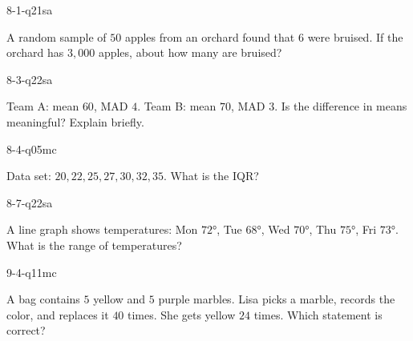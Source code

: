 \begin{practiceQuestion}{8-1-q21}{sa}
\begin{questionText}
A random sample of $50$ apples from an orchard found that $6$ were bruised. If the orchard has $3{,}000$ apples, about how many are bruised?
\end{questionText}
\end{practiceQuestion}

\begin{practiceQuestion}{8-3-q22}{sa}
\begin{questionText}
Team A: mean $60$, MAD $4$. Team B: mean $70$, MAD $3$. Is the difference in means meaningful? Explain briefly.
\end{questionText}
\end{practiceQuestion}

\begin{practiceQuestion}{8-4-q05}{mc}
\begin{questionText}
Data set: $20, 22, 25, 27, 30, 32, 35$. What is the IQR?
\end{questionText}
\end{practiceQuestion}

\begin{practiceQuestion}{8-7-q22}{sa}
\begin{questionText}
A line graph shows temperatures: Mon $72°$, Tue $68°$, Wed $70°$, Thu $75°$, Fri $73°$. What is the range of temperatures?
\end{questionText}
\end{practiceQuestion}

\begin{practiceQuestion}{9-4-q11}{mc}
\begin{questionText}
A bag contains $5$ yellow and $5$ purple marbles. Lisa picks a marble, records the color, and replaces it $40$ times. She gets yellow $24$ times. Which statement is correct?
\end{questionText}
\end{practiceQuestion}

